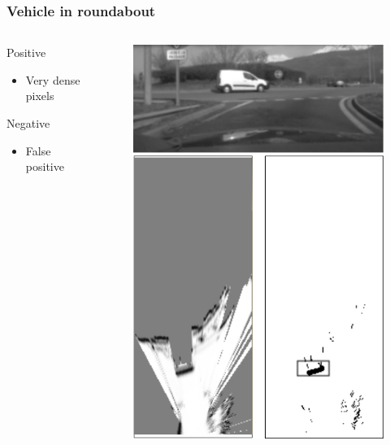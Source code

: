 \documentclass{beamer}
\begin{document}
	\begin{frame}
		\frametitle{Vehicle in roundabout}
		\begin{columns}[t]
			\begin{column}[t]{5cm}
				\begin{exampleblock}{Positive}
				\begin{itemize}
				\item Very dense pixels
				\end{itemize}
				\end{exampleblock}
								
				\begin{alertblock}{Negative}
				\begin{itemize}
				\item False positive 
				\end{itemize}
				\end{alertblock}	
			\end{column}
			\begin{column}[t]{5cm}
				\begin{figure}[h]
				\center
				\includegraphics[scale=0.55]{../img/fig:result:scenetwocarrondepoint}
				\end{figure}
			\end{column}
		\end{columns}
	\end{frame}
\end{document}
